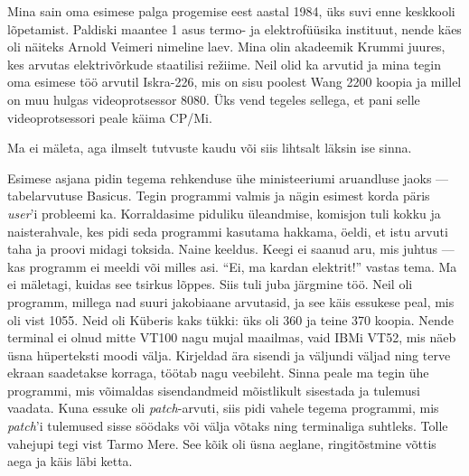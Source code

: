 Mina sain oma esimese palga progemise eest aastal 1984, 
üks suvi enne keskkooli lõpetamist. Paldiski maantee 1 asus termo- ja 
elektrofüüsika instituut, nende käes oli näiteks Arnold Veimeri nimeline laev.
Mina olin akadeemik Krummi juures, 
kes arvutas elektrivõrkude staatilisi režiime. Neil olid ka 
arvutid ja mina tegin oma esimese töö arvutil 
Iskra-226, mis on sisu poolest Wang 2200 koopia ja millel on muu hulgas videoprotsessor
8080. Üks vend tegeles sellega, et 
pani selle videoprotsessori peale käima CP/Mi. 


Ma ei mäleta, aga ilmselt tutvuste 
kaudu või siis lihtsalt läksin ise sinna.


Esimese asjana pidin tegema rehkenduse ühe
ministeeriumi aruandluse jaoks --- tabelarvutuse Basicus. Tegin programmi valmis ja nägin esimest korda 
päris \emph{user}'i probleemi ka. Korraldasime piduliku üleandmise, 
komisjon tuli 
kokku ja naisterahvale, kes pidi seda 
programmi kasutama hakkama, öeldi, et istu arvuti taha ja proovi 
midagi toksida. Naine keeldus. Keegi ei saanud aru, 
mis juhtus --- kas programm ei meeldi või milles asi. \enquote{Ei, ma kardan 
elektrit!} vastas tema. Ma ei mäletagi, kuidas see tsirkus lõppes. 
Siis tuli juba järgmine töö. Neil oli programm, millega nad suuri jakobiaane 
arvutasid, ja see käis essukese peal, mis oli vist 1055. Neid 
oli Küberis kaks tükki: üks oli 360 ja teine 370 koopia. Nende terminal ei olnud 
mitte VT100 nagu mujal maailmas, vaid IBMi VT52, mis näeb üsna 
hüperteksti moodi välja. Kirjeldad ära sisendi ja väljundi väljad ning terve 
ekraan saadetakse korraga, töötab nagu veebileht. Sinna peale 
ma tegin ühe programmi, mis võimaldas sisendandmeid mõistlikult sisestada ja tulemusi vaadata. Kuna essuke oli \emph{patch}-arvuti, siis pidi 
vahele tegema programmi, mis \emph{patch}'i tulemused 
sisse söödaks või välja võtaks ning 
terminaliga suhtleks. Tolle vahejupi tegi vist Tarmo Mere. See kõik oli üsna aeglane, ringitõstmine võttis
aega ja käis läbi ketta.

